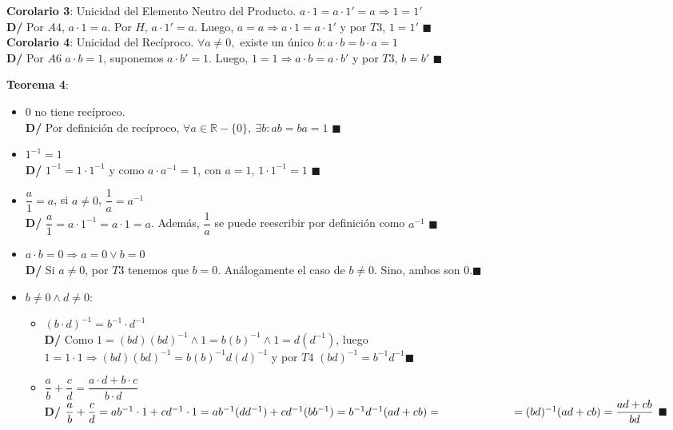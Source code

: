 \documentclass[11pt,a4paper]{article}
\newcommand*{\QEDA}{\null\nobreak\hfill\ensuremath{\blacksquare}}
\begin{document}
\noindent \textbf{Corolario 3}: Unicidad del Elemento Neutro del Producto. $a \cdot 1 = a \cdot 1' = a \Rightarrow 1 = 1'$\\
\textbf{D/} Por $A4$, $a \cdot 1 = a$. Por $H$, $a \cdot 1' = a$. Luego, $a = a \Rightarrow a \cdot 1 = a \cdot 1'$ y por $T3$, $1 = 1'$ \QEDA\\

\noindent \textbf{Corolario 4}: Unicidad del Rec\'iproco. $\forall a \not = 0,$ existe un \'unico $b : a\cdot b = b\cdot a = 1$\\
\textbf{D/} Por $A6$ $a \cdot b = 1$, suponemos $a \cdot b' = 1$. Luego, $1=1 \Rightarrow a \cdot b = a \cdot b'$ y por $T3$, $b = b'$ \QEDA\\

\newpage

\noindent \textbf{Teorema 4}:
\begin{itemize}
\item $0$ no tiene rec\'iproco.\\
\textbf{D/} Por definici\'on de rec\'iproco, $\forall a \in \mathbb{R} - \{0\},\ \exists b : ab = ba = 1$ \QEDA
\item $1^{-1} = 1$\\
\textbf{D/} $1^{-1} = 1 \cdot 1^{-1}$ y como $a \cdot a^{-1} = 1$, con $a=1$, $1 \cdot 1^{-1} = 1$ \QEDA
\item $\dfrac{a}{1} = a$, si $a \not = 0$, $\dfrac{1}{a} = a^{-1}$\\
\textbf{D/} $\dfrac{a}{1} = a \cdot 1^{-1} = a \cdot 1 = a$. Adem\'as, $\dfrac{1}{a}$ se puede reescribir por definici\'on como $a^{-1}$ \QEDA
\item $a\cdot b = 0 \Rightarrow a=0 \lor b=0$\\
\textbf{D/} Si $a \not = 0$, por $T3$ tenemos que $b = 0$. An\'alogamente el caso de $b \not = 0$. Sino, ambos son 0.\QEDA
\item $b \not = 0 \land d \not = 0$:
\begin{itemize}
\item $(b\cdot d)^{-1} = b^{-1} \cdot d^{-1}$\\
\textbf{D/} Como $1 = (bd)(bd)^{-1} \land 1 = b(b)^{-1} \land 1 = d(d^{-1})$, luego \\ 
$1 = 1 \cdot 1 \Rightarrow (bd)(bd)^{-1} = b(b)^{-1} d(d)^{-1}$ y por $T4$ $(bd)^{-1} = b^{-1} d^{-1}$\QEDA
\item $\dfrac{a}{b}+\dfrac{c}{d} = \dfrac{a\cdot d + b\cdot c}{b\cdot d}$\\
\textbf{D/} $\dfrac{a}{b}+\dfrac{c}{d} = ab^{-1}\cdot 1+cd^{-1} \cdot 1 = ab^{-1}(dd^{-1})+cd^{-1}(bb^{-1}) = b^{-1}d^{-1}(ad+cb) = \\ \indent \ \ \ \ \ \ \ \ \ \ \ \ \ \ = (bd)^{-1}(ad+cb) = \dfrac{ad+cb}{bd}$ \QEDA

\end{itemize}
\end{itemize}
\end{document}
